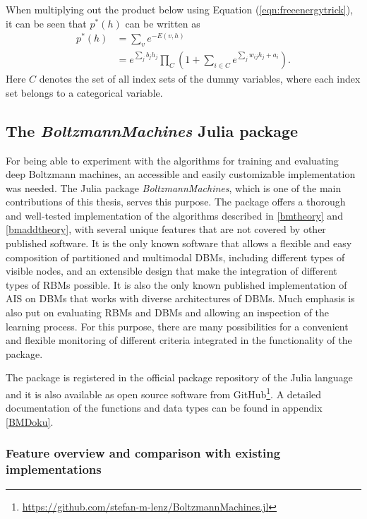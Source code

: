 \documentclass[12pt]{article}
\newcommand{\apkg}[1]{\emph{#1}}
\begin{document}
When multiplying out the product below using Equation (\ref{eqn:freeenergytrick}), it can be seen that $p^*(h)$ can be written as
\begin{align*}
p^*(h) &= \sum_v e^{-E(v,h)} \\
&= e^{\sum_j b_j h_j} \prod_{C} \left( 1 + \sum_{i \in C} e^{\sum_j w_{ij} h_j + a_i} \right).
\end{align*}
Here $C$ denotes the set of all index sets of the dummy variables, where each index set belongs to a categorical variable.
\clearpage

\subsection{The \apkg{BoltzmannMachines} Julia package}
For being able to experiment with the algorithms for training and evaluating deep Boltzmann machines, an accessible and easily customizable implementation was needed.
The Julia package \apkg{BoltzmannMachines}, which is one of the main contributions of this thesis, serves this purpose.
The package offers a thorough and well-tested implementation of the algorithms described in \ref{bmtheory} and \ref{bmaddtheory}, with several unique features that are not covered by other published software.
It is the only known software that allows a flexible and easy composition of partitioned and multimodal DBMs, including different types of visible nodes, and an extensible design that make the integration of different types of RBMs possible.
It is also the only known published implementation of AIS on DBMs that works with diverse architectures of DBMs.
Much emphasis is also put on evaluating RBMs and DBMs and allowing an inspection of the learning process.
For this purpose, there are many possibilities for a convenient and flexible monitoring of different criteria integrated in the functionality of the package.

The package is registered in the official package repository of the Julia language and it is also available as open source software from GitHub\footnote{\url{https://github.com/stefan-m-lenz/BoltzmannMachines.jl}}.
A detailed documentation of the functions and data types can be found in appendix \ref{BMDoku}.


\subsubsection{Feature overview and comparison with existing implementations}\label{BMfeatures}
\end{document}
